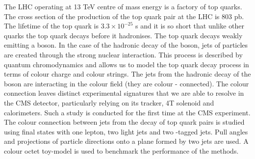 The LHC operating at 13 TeV centre of mass energy is a factory of top quarks. The cross section of the production of the top quark pair at the LHC is 803 pb. The lifetime of the top quark is $3.3\times10^{-25}$ s and it is so short that unlike other quarks the top quark decays before it hadronises. The top quark decays weakly emitting a \PW boson. In the case of the hadronic decay of the \PW boson, jets of particles are created through the strong nuclear interaction. This process is described by quantum chromodynamics and allows us to model the top quark decay process in terms of colour charge and colour strings. The jets from the hadronic decay of the \PW boson are interacting in the colour field (they are colour - connected). The colour connection leaves distinct experimental signatures that we are able to resolve in the CMS detector, particularly relying on its tracker, 4T solenoid and calorimeters. Such a study is conducted for the first time at the CMS experiment. The colour connection between jets from the decay of top quark pairs is studied using final states with one lepton, two light jets and two \cPqb-tagged jets. Pull angles and projections of particle directions onto a plane formed by two jets are used. A colour octet \PW toy-model is used to benchmark the performance of the methods.
